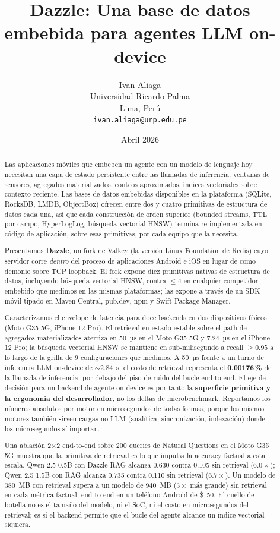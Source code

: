 \documentclass[11pt]{article}
\title{Dazzle: Una base de datos embebida para agentes LLM on-device}
\author{
    Ivan Aliaga \\
    Universidad Ricardo Palma \\
    Lima, Perú \\
    \texttt{ivan.aliaga@urp.edu.pe}
}
\date{Abril 2026}
\let\OldTexttt\texttt
\renewcommand{\texttt}[1]{\OldTexttt{\seqsplit{#1}}}
\begin{document}
\maketitle

\begin{abstract}
Las aplicaciones móviles que embeben un agente con un modelo de
lenguaje hoy necesitan una capa de estado persistente entre las
llamadas de inferencia: ventanas de sensores, agregados
materializados, conteos aproximados, índices vectoriales sobre
contexto reciente. Las bases de datos embebidas disponibles en la
plataforma (SQLite, RocksDB, LMDB, ObjectBox) ofrecen entre dos y
cuatro primitivas de estructura de datos cada una, así que cada
construcción de orden superior (bounded streams, TTL por campo,
HyperLogLog, búsqueda vectorial HNSW) termina re-implementada en
código de aplicación, sobre esas primitivas, por cada equipo que la
necesita.

Presentamos \textbf{Dazzle}, un fork de Valkey (la versión Linux
Foundation de Redis) cuyo servidor corre \emph{dentro} del proceso
de aplicaciones Android e iOS en lugar de como demonio sobre TCP
loopback. El fork expone diez primitivas nativas de estructura de
datos, incluyendo búsqueda vectorial HNSW, contra $\leq 4$ en
cualquier competidor embebido que medimos en las mismas
plataformas; las expone a través de un SDK móvil tipado en Maven
Central, pub.dev, npm y Swift Package Manager.

Caracterizamos el envelope de latencia para doce backends en dos
dispositivos físicos (Moto G35 5G, iPhone 12 Pro). El retrieval en
estado estable sobre el path de agregados materializados aterriza
en 50~µs en el Moto G35 5G y 7.24~µs en el iPhone 12 Pro; la
búsqueda vectorial HNSW se mantiene en sub-milisegundo a recall
$\geq 0.95$ a lo largo de la grilla de 9 configuraciones que
medimos. A 50~µs frente a un turno de inferencia LLM on-device de
$\sim 2.84$~s, el costo de retrieval representa el
\textbf{0.00176\,\%} de la llamada de inferencia: por debajo del
piso de ruido del bucle end-to-end. El eje de decisión para un
backend de agente on-device es por tanto la \textbf{superficie
primitiva y la ergonomía del desarrollador}, no los deltas de
microbenchmark. Reportamos los números absolutos por motor en
microsegundos de todas formas, porque los mismos motores también
sirven cargas no-LLM (analítica, sincronización, indexación) donde
los microsegundos sí importan.

Una ablación 2$\times$2 end-to-end sobre 200 queries de Natural
Questions en el Moto G35 5G muestra que la primitiva de retrieval
es lo que impulsa la accuracy factual a esta escala. Qwen 2.5 0.5B
con Dazzle RAG alcanza 0.630 \texttt{EM\_contains} contra 0.105 sin
retrieval ($6.0\times$); Qwen 2.5 1.5B con RAG alcanza 0.735 contra
0.110 sin retrieval ($6.7\times$). Un modelo de 380~MB con
retrieval supera a un modelo de 940~MB ($3\times$ más grande) sin
retrieval en cada métrica factual, end-to-end en un teléfono
Android de \$150. El cuello de botella no es el tamaño del modelo,
ni el SoC, ni el costo en microsegundos del retrieval; es si el
backend permite que el bucle del agente alcance un índice
vectorial siquiera.
\end{abstract}
\end{document}
